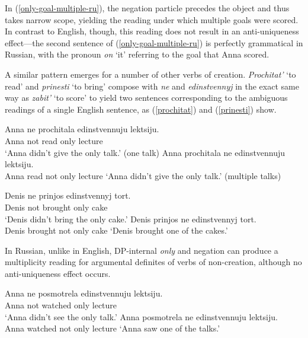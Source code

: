 \documentclass{article}
\begin{document}
In (\ref{only-goal-multiple-ru}), the negation particle precedes the object and thus takes narrow scope, yielding the reading under which multiple goals were scored. In contrast to English, though, this reading does not result in an anti-uniqueness effect---the second sentence of (\ref{only-goal-multiple-ru}) is perfectly grammatical in Russian, with the pronoun \textit{on} `it' referring to the goal that Anna scored.


A similar pattern emerges for a number of other verbs of creation. \textit{Prochitat'} `to read' and \textit{prinesti} `to bring' compose with \textit{ne} and \textit{edinstvennyj} in the exact same way as \textit{zabit'} `to score' to yield two sentences corresponding to the ambiguous readings of a single English sentence, as (\ref{prochitat}) and (\ref{prinesti}) show.

\begin{exe}
	\ex \label{prochitat} \begin{xlist}
		\ex \gll Anna ne prochitala edinstvennuju lektsiju.\\
		Anna not read only lecture\\
		\glt `Anna didn't give the only talk.' (one talk)
		\ex Anna prochitala ne edinstvennuju lektsiju.\\
		Anna read not only lecture
		\glt `Anna didn't give the only talk.' (multiple talks)
	\end{xlist}
	\ex \label{prinesti} \begin{xlist}
		\ex \gll Denis ne prinjos edinstvennyj tort.\\
		Denis not brought only cake\\
		\glt `Denis didn't bring the only cake.'
		\ex Denis prinjos ne edinstvennyj tort.\\
		Denis brought not only cake
		\glt `Denis brought one of the cakes.'
	\end{xlist}
\end{exe}

In Russian, unlike in English, DP-internal \textit{only} and negation can produce a multiplicity reading for argumental definites of verbs of non-creation, although no anti-uniqueness effect occurs.

\begin{exe}
	\ex \label{see-only-goal-ru} \begin{xlist}
		\ex \gll Anna ne posmotrela edinstvennuju lektsiju.\\
		Anna not watched only lecture\\
		\glt `Anna didn't see the only talk.'
		\ex Anna posmotrela ne edinstvennuju lektsiju.\\
		Anna watched not only lecture
		\glt `Anna saw one of the talks.'
	\end{xlist}
\end{exe}
\end{document}
